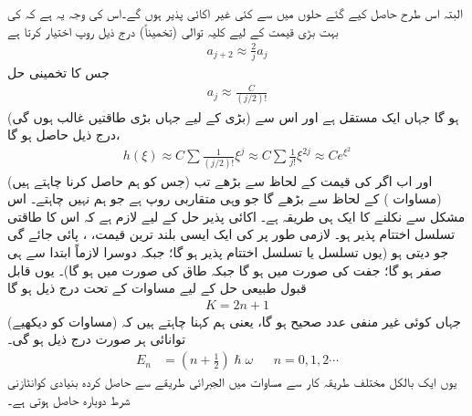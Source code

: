  البتہ اس طرح حاصل کیے گئے  حلوں میں سے کئی غیر اکائی پذیر ہوں گے۔اس کی وجہ یہ ہے کہ   کی بہت بڑی قیمت کے لیے کلیہ توالی (تخمیناً)  درج ذیل روپ اختیار کرتا ہے
\begin{align*}
a_{j+2}\approx\frac{2}{j}a_{j}
\end{align*}
جس کا تخمینی حل
\begin{align*}
a_{j}\approx\frac{C}{(j/2)!}
\end{align*}
ہو گا جہاں  ایک مستقل ہے اور اس سے (بڑی  کے لیے جہاں بڑی طاقتیں غالب ہوں گی)  درج ذیل حاصل ہو گا،
\begin{align*}
h(\xi)\approx C\sum\frac{1}{(j/2)!}\xi^{j}\approx C\sum\frac{1}{j!}\xi^{2j}\approx Ce^{\xi^{2}}
\end{align*}
اور اب اگر  کی قیمت  کے لحاظ سے بڑھے تب  (جس کو ہم حاصل کرنا چاہتے ہیں) 
  (مساوات ) کے لحاظ سے بڑھے گا جو وہی متقاربی 
 روپ ہے جو ہم نہیں چاہتے۔ اس مشکل سے نکلنے کا ایک ہی طریقہ ہے۔ اکائی پذیر حل کے لیے لازم ہے کہ اس کا طاقتی تسلسل اختتام پذیر ہو۔ لازمی طور پر  کی ایک ایسی بلند ترین قیمت، ، پائی جائے گی جو  دیتی ہو (یوں  تسلسل یا  تسلسل اختتام پذیر ہو گا؛ جبکہ دوسرا لازماً ابتدا سے ہی صفر ہو گا؛ جفت  کی صورت میں  ہو گا جبکہ طاق  کی صورت میں  ہو گا)۔ یوں قابل قبول طبیعی حل کے لیے مساوات  کے تحت درج ذیل ہو گا
\begin{align*}
K=2n+1
\end{align*}
 جہاں  کوئی غیر منفی عدد صحیح ہو گا، یعنی ہم کہنا چاہتے ہیں کہ (مساوات  کو دیکھیے) توانائی ہر صورت درج ذیل ہو گی۔
\begin{align}
E_{n}&=(n+\tfrac{1}{2} )\hslash\omega && n=0,1,2\cdots
\end{align}
یوں ایک   بالکل مختلف طریقہ کار سے مساوات  میں الجبرائی طریقے سے حاصل کردہ بنیادی کوانٹازنی شرط دوبارہ حاصل ہوتی ہے۔ 

